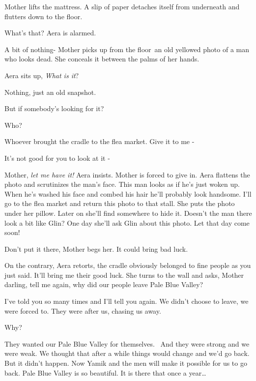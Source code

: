\documentclass[12pt]{book}
\begin{document}
Mother lifts the mattress. A slip of paper detaches itself from underneath and{ }flutters down to the
floor.

{\textquotedbl}What's that?{\textquotedbl} Aera is alarmed.

{\textquotedbl}A bit of nothing-{\textquotedbl} Mother picks up from the floor~an old yellowed photo of a man who looks
dead. She conceals{ }it between the palms of her hands.

Aera sits up, {\textquotedbl}\textit{What is it}?{\textquotedbl}~

{\textquotedbl}Nothing, just an old snapshot.{\textquotedbl}

{\textquotedbl}But if somebody's looking for it?{\textquotedbl}

{\textquotedbl}Who?{\textquotedbl}

{\textquotedbl}Whoever brought the cradle to the flea market. Give it to me -{\textquotedbl}

{\textquotedbl}It's not good for you to look at it -{\textquotedbl}

{\textquotedbl}Mother, \textit{let me have it!}{\textquotedbl} Aera insists. Mother is forced to give in. Aera flattens
the photo and scrutinizes the man's face. {\textquotedbl}This man looks as if he's just woken up. When he's washed his
face and combed his hair he'll probably look handsome. I'll go to the flea market and return this photo to that
stall.{\textquotedbl} She puts the photo under her pillow. Later on she'll find somewhere to hide it. Doesn't the man
there look a bit like Glin? One day she'll ask Glin about this photo. Let that day come soon!

{\textquotedbl}Don't put it there,{\textquotedbl} Mother begs her. {\textquotedbl}It could bring bad
luck.{\textquotedbl}

{\textquotedbl}On the contrary,{\textquotedbl} Aera retorts, {\textquotedbl}the cradle obviously belonged to fine people
as you just said. It'll bring me their good luck.{\textquotedbl} She turns to the wall and asks, {\textquotedbl}Mother
darling, tell me again, why did our people leave Pale Blue Valley?{\textquotedbl}

{\textquotedbl}I've told you so many times and I'll tell you again. We didn't choose to leave, we were forced to. They
were after us, chasing us away.{\textquotedbl}

{\textquotedbl}Why?{\textquotedbl}

{\textquotedbl}They wanted our Pale Blue Valley for themselves. ~And they were strong and we were weak. We thought that
after a while things would change and we'd go back. But it didn't happen. Now Yamik and the men will make it possible
for us to go back. Pale Blue Valley is so beautiful. It is there that once a year{\dots} {\textquotedbl}
\end{document}
